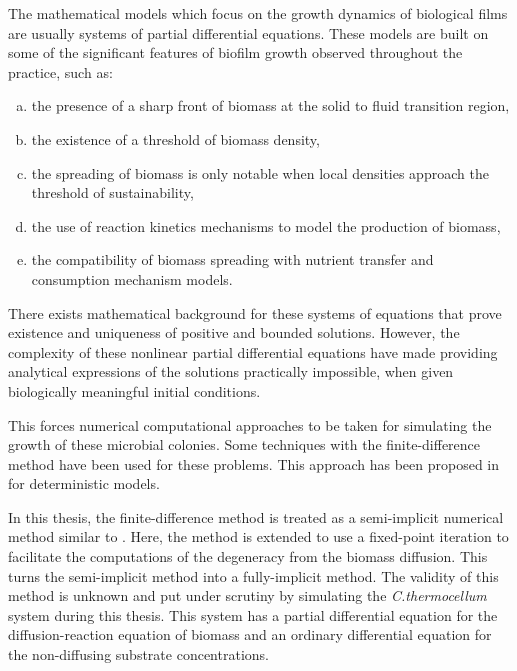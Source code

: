 The mathematical models which focus on the growth dynamics of biological films are usually systems of partial differential equations.
These models are built on some of the significant features of biofilm growth observed throughout the practice, such as:
\begin{enumerate}[a)]
  \item the presence of a sharp front of biomass at the solid to fluid transition region,
  \item the existence of a threshold of biomass density,
  \item the spreading of biomass is only notable when local densities approach the threshold of sustainability,
  \item the use of reaction kinetics mechanisms to model the production of biomass,
  \item the compatibility of biomass spreading with nutrient transfer and consumption mechanism models.
\end{enumerate}
There exists mathematical background for these systems of equations that prove existence and uniqueness of positive and bounded solutions.
However, the complexity of these nonlinear partial differential equations have made providing analytical expressions of the solutions practically impossible, when given biologically meaningful initial conditions.

This forces numerical computational approaches to be taken for simulating the growth of these microbial colonies.
Some techniques with the finite-difference method have been used for these problems. 
This approach has been proposed in \cite{eberl2007finite} for deterministic models.

In this thesis, the finite-difference method is treated as a semi-implicit numerical method similar to \cite{eberl2007finite}.
Here, the method is extended to use a fixed-point iteration to facilitate the computations of the degeneracy from the biomass diffusion.
This turns the semi-implicit method into a fully-implicit method.
The validity of this method is unknown and put under scrutiny by simulating the \textit{C.thermocellum} system during this thesis.
This system has a partial differential equation for the diffusion-reaction equation of biomass and an ordinary differential equation for the non-diffusing substrate concentrations.

